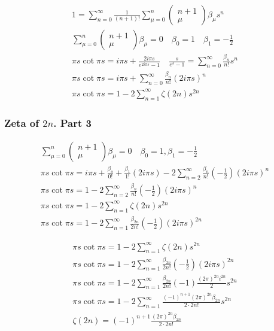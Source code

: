	$$
	\begin{gathered}
		1=\sum_{n=0}^{\infty} \frac{1}{(n+1) !} \sum_{\mu=0}^n\left(\begin{array}{c}
			n+1 \\
			\mu
		\end{array}\right) \beta_\mu s^n \\
		\sum_{\mu=0}^n\left(\begin{array}{c}
			n+1 \\
			\mu
		\end{array}\right) \beta_\mu=0 \quad \beta_0=1 \quad \beta_1=-\frac{1}{2} \\
		\pi s \cot \pi s=i \pi s+\frac{2 i \pi s}{e^{2 i \pi s}-1} \quad \frac{s}{e^s-1}=\sum_{n=0}^{\infty} \frac{\beta_n}{n !} s^n \\
		\pi s \cot \pi s=i \pi s+\sum_{n=0}^{\infty} \frac{\beta_n}{n !}(2 i \pi s)^n \\
		\pi s \cot \pi s=1-2 \sum_{n=1}^{\infty} \zeta(2 n) s^{2 n}
	\end{gathered}
	$$
	
	\subsubsection{Zeta of $2n$. Part 3}
	
	$$
	\begin{gathered}
		\sum_{\mu=0}^n\left(\begin{array}{c}
			n+1 \\
			\mu
		\end{array}\right) \beta_\mu=0 \quad \beta_0=1, \beta_1=-\frac{1}{2} \\
		\pi s \cot \pi s=i \pi s+\frac{\beta_o}{0 !}+\frac{\beta_1}{1 !}(2 i \pi s)-2 \sum_{n=2}^{\infty} \frac{\beta_n}{n !}\left(-\frac{1}{2}\right)(2 i \pi s)^n \\
		\pi s \cot \pi s=1-2 \sum_{n=2}^{\infty} \frac{\beta_n}{n !}\left(-\frac{1}{2}\right)(2 i \pi s)^n \\
		\pi s \cot \pi s=1-2 \sum_{n=1}^{\infty} \zeta(2 n) s^{2 n} \\
		\pi s \cot \pi s=1-2 \sum_{n=1}^{\infty} \frac{\beta_{2 n}}{2 n !}\left(-\frac{1}{2}\right)(2 i \pi s)^{2 n}
	\end{gathered}
	$$
	
	$$
	\begin{gathered}
		\pi s \cot \pi s=1-2 \sum_{n=1}^{\infty} \zeta(2 n) s^{2 n} \\
		\pi s \cot \pi s=1-2 \sum_{n=1}^{\infty} \frac{\beta_{2 n}}{2 n !}\left(-\frac{1}{2}\right)(2 i \pi s)^{2 n} \\
		\pi s \cot \pi s=1-2 \sum_{n=1}^{\infty} \frac{\beta_{2 n}}{2 n !}(-1) \frac{(2 \pi)^{2 n} i^{2 n}}{2} s^{2 n} \\
		\pi s \cot \pi s=1-2 \sum_{n=1}^{\infty} \frac{(-1)^{n+1}(2 \pi)^{2 n} \beta_{2 n}}{2 \cdot 2 n !} s^{2 n} \\
		\zeta(2 n)=(-1)^{n+1} \frac{(2 \pi)^{2 n} \beta_{2 n}}{2 \cdot 2 n !}
	\end{gathered}
	$$
	
